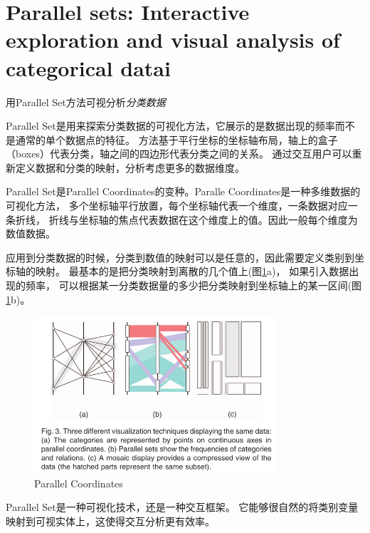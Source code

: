 \documentclass{article}
\begin{document}
\normalem
\section{Parallel sets: Interactive exploration and
	visual analysis of categorical datai\cite{kosara2006parallel}}

	用Parallel Set方法可视分析\emph{分类数据}

	Parallel Set是用来探索分类数据的可视化方法，它展示的是数据出现的频率而不是通常的单个数据点的特征。
	方法基于平行坐标的坐标轴布局，轴上的盒子（boxes）代表分类，轴之间的四边形代表分类之间的关系。
	通过交互用户可以重新定义数据和分类的映射，分析考虑更多的数据维度。

	Parallel Set是Parallel Coordinates的变种。Paralle Coordinates是一种多维数据的可视化方法，
	多个坐标轴平行放置，每个坐标轴代表一个维度，一条数据对应一条折线，
	折线与坐标轴的焦点代表数据在这个维度上的值。因此一般每个维度为数值数据。

	应用到分类数据的时候，分类到数值的映射可以是任意的，因此需要定义类别到坐标轴的映射。
	最基本的是把分类映射到离散的几个值上(图\ref{fig:parallelcoordinates1}a)，
	如果引入数据出现的频率，
	可以根据某一分类数据量的多少把分类映射到坐标轴上的某一区间(图\ref{fig:parallelcoordinates1}b)。
	\begin{figure}[h]
		\centering
		\includegraphics[width=0.8\textwidth]{"_img/Parallel_Coordinates_1.png"}
		\caption{Parallel Coordinates}
		\label{fig:parallelcoordinates1}
	\end{figure}

	Parallel Set是一种可视化技术，还是一种交互框架。
	它能够很自然的将类别变量映射到可视实体上，这使得交互分析更有效率。
\end{document}
